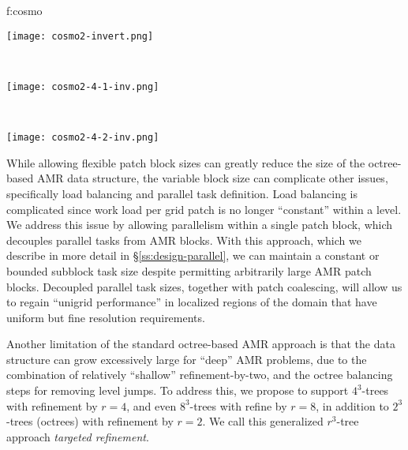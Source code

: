\documentclass[11pt,letterpaper]{article}
\begin{document}
 {f:cosmo}{
\begin{minipage}{\textwidth}
\begin{center}
\begin{minipage}{2.0in}
\texttt{[image: cosmo2-invert.png]}
\end{minipage} \ 
\begin{minipage}{2.0in}
\texttt{[image: cosmo2-4-1-inv.png]}
\end{minipage} \ 
\begin{minipage}{2.0in}
\texttt{[image: cosmo2-4-2-inv.png]}
\end{minipage}
\end{center}
\end{minipage}
}

While allowing flexible patch block sizes can greatly reduce the size
of the octree-based AMR data structure, the variable block size can
complicate other issues, specifically load balancing and parallel task
definition.  Load balancing is complicated since work load per grid
patch is no longer ``constant'' within a level.  We address this issue
by allowing parallelism within a single patch block, which decouples
parallel tasks from AMR blocks.  With this approach, which we describe
in more detail in \S\ref{ss:design-parallel}, we can maintain a
constant or bounded subblock task size despite permitting arbitrarily
large AMR patch blocks.  Decoupled parallel task sizes, together with
patch coalescing, will allow us to regain ``unigrid performance'' in
localized regions of the domain that have uniform but fine resolution
requirements.


\SUBSUBSECTION{Targeted refinement}
%
Another limitation of the standard octree-based AMR approach is that
the data structure can grow excessively large for ``deep'' AMR
problems, due to the combination of relatively ``shallow''
refinement-by-two, and the octree balancing steps for removing level
jumps.  To address this, we propose to support $4^3$-trees with
refinement by $r=4$, and even $8^3$-trees with refine by $r=8$, in
addition to $2^3$-trees (octrees) with refinement by $r=2$.  We call
this generalized $r^3$-tree approach \textit{targeted refinement}.
\end{document}
